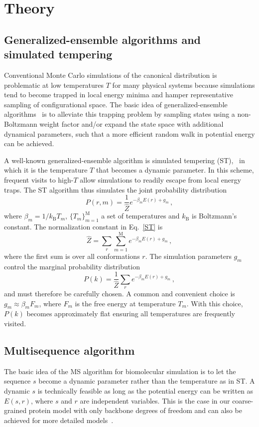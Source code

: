 \documentclass[%
 aip,
rsi,%
 amsmath,amssymb,
 reprint,%
]{revtex4-1}
\newcommand	 {\sbar}	{{s}}
\newcommand	 {\rbar}	{{r}}
\begin{document}
\section{Theory}

\subsection{Generalized-ensemble algorithms and simulated tempering}
\noindent
Conventional Monte Carlo simulations of the canonical distribution is problematic at low temperatures $T$ for many physical systems because simulations tend to become trapped in local energy minima and hamper representative sampling of configurational space. The basic idea of generalized-ensemble algorithms~\cite{Mitsutake2001} is to alleviate this trapping problem by sampling states using a non-Boltzmann weight factor and/or expand the state space with additional dynamical parameters, such that a more efficient random walk in potential energy can be achieved. 

A well-known generalized-ensemble algorithm is simulated tempering (ST),~\cite{Marinari1992,Lyubartsev1992} in which it is the temperature $T$ that becomes a dynamic parameter. In this scheme, frequent visits to high-$T$ allow simulations to readily escape from local energy traps. The ST algorithm thus simulates the joint probability distribution 
\begin{equation}
P(\rbar,m) =\dfrac{1}{\hat{Z}} e^{-\beta_m E(\rbar) + g_m}\,,
\label{ST}
\end{equation}
where  $\beta_m=1/k_\mathrm{B} T_m$, $\{T_m\}_{m=1}^\mathrm{M}$ a set of temperatures and $k_\mathrm{B}$ is Boltzmann's constant. The normalization constant in Eq.~\ref{ST} is  
\begin{equation}
\hat{Z} = \sum_r \sum_{m=1}^{\mathrm{M}}e^{-\beta_m E(\rbar) + g_m}\,,
\end{equation}
where the first sum is over all conformations $\rbar$. The simulation parameters $g_m$ control the marginal probability distribution
\begin{equation}
P(k) = \frac{1}{\hat{Z}}\sum_r e^{-\beta_m E(\rbar) + g_m} \,,
\end{equation}
and must therefore be carefully chosen. A common and convenient choice is $g_m\approx \beta_m F_m$, where $F_m$ is the free energy at temperature $T_m$. With this choice, $P(k)$ becomes approximately flat ensuring all temperatures are frequently visited. 

\subsection{Multisequence algorithm}
\noindent 
The basic idea of the MS algorithm for biomolecular simulation is to let the sequence $\sbar$ become a dynamic parameter rather than the temperature as in ST. A dynamic $\sbar$ is technically feasible as long as the potential energy can be written as $E(\sbar,\rbar)$, where $\sbar$ and $\rbar$ are independent variables. This is the case in our coarse-grained protein model with only backbone degrees of freedom and can also be achieved for more detailed  models~\cite{Bhattacherjee2013,Wallin2017}. 
\end{document}
